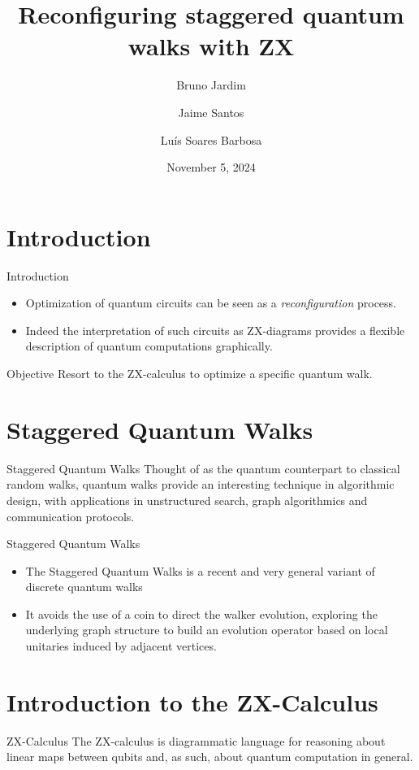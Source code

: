 \documentclass{beamer}
\title{Reconfiguring staggered quantum walks with ZX}
\date{November 5, 2024}
\author{Bruno Jardim \and Jaime Santos \and Luís Soares Barbosa}
\institute{HASLab - INESCTEC}
\begin{document}
\maketitle

\section{Introduction}
\begin{frame}{Introduction}

\begin{itemize}
\item Optimization of quantum circuits can be seen as a \emph{reconfiguration} process. 
\item Indeed the interpretation of such circuits as ZX-diagrams provides a flexible description of quantum computations graphically.
\end{itemize}

\begin{block}{Objective}
Resort to the ZX-calculus to optimize a specific quantum walk.
\end{block}
\end{frame}


\section{Staggered Quantum Walks}
\begin{frame}{Staggered Quantum Walks}
	Thought of as the quantum counterpart to classical random walks, quantum walks provide an interesting technique in algorithmic design, with  applications in unstructured search, graph algorithmics and communication protocols.
	
	\begin{block}{Staggered Quantum Walks}
	\begin{itemize}
	\item The Staggered Quantum Walks is a recent and very general variant of discrete quantum walks 
	\item It avoids the use of a coin to direct the walker evolution, exploring the underlying graph structure to build an evolution operator based on local unitaries induced by adjacent vertices.
	\end{itemize}
\end{block}
	
\end{frame}


\section{Introduction to the ZX-Calculus}
\begin{frame}{ZX-Calculus}
	The ZX-calculus is diagrammatic language for reasoning about linear maps between qubits and, as such, about quantum computation in general.


\end{frame}
\end{document}
